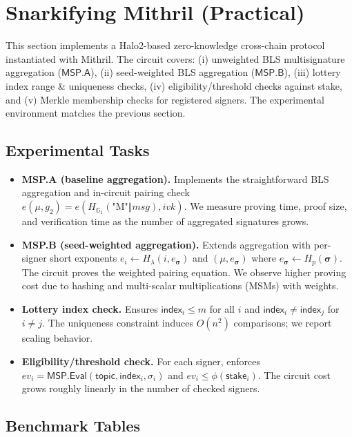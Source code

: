 \documentclass{article}
\begin{document}
\newpage

\section{Snarkifying Mithril (Practical)}
\label{sec:snarkifying-mithril-practical}

This section implements a Halo2-based zero-knowledge cross-chain protocol instantiated with Mithril. The circuit covers: (i) unweighted BLS multisignature aggregation ($\mathsf{MSP.A}$), (ii) seed-weighted BLS aggregation ($\mathsf{MSP.B}$), (iii) lottery index range \& uniqueness checks, (iv) eligibility/threshold checks against stake, and (v) Merkle membership checks for registered signers. The experimental environment matches the previous section.

\subsection{Experimental Tasks}
\begin{itemize}
  \item \textbf{MSP.A (baseline aggregation).} Implements the straightforward BLS aggregation and in-circuit pairing check $e(\mu,g_2)=e(H_{\mathbb{G}_1}(\text{"M"}\Vert msg), ivk)$. We measure proving time, proof size, and verification time as the number of aggregated signatures grows.
  \item \textbf{MSP.B (seed-weighted aggregation).} Extends aggregation with per-signer short exponents $e_i \leftarrow H_\lambda(i,e_{\boldsymbol{\sigma}})$ and $(\mu,e_{\boldsymbol{\sigma}})$ where $e_{\boldsymbol{\sigma}}\leftarrow H_p(\boldsymbol{\sigma})$. The circuit proves the weighted pairing equation. We observe higher proving cost due to hashing and multi-scalar multiplications (MSMs) with weights.
  \item \textbf{Lottery index check.} Ensures $\mathsf{index}_i\!\le m$ for all $i$ and $\mathsf{index}_i\!\ne\!\mathsf{index}_j$ for $i\ne j$. The uniqueness constraint induces $O(n^2)$ comparisons; we report scaling behavior.
  \item \textbf{Eligibility/threshold check.} For each signer, enforces $ev_i=\mathsf{MSP.Eval}(\mathsf{topic},\mathsf{index}_i,\sigma_i)$ and $ev_i \le \phi(\mathsf{stake}_i)$. The circuit cost grows roughly linearly in the number of checked signers.
\end{itemize}

\subsection{Benchmark Tables}
\end{document}
